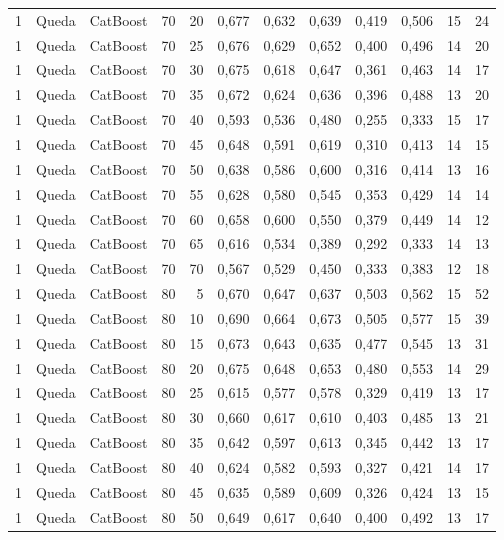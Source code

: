 \begin{longtable}{@{}rllrrrrrrrrr@{}}
1 & Queda & CatBoost & 70 & 20 & 0,677 & 0,632 & 0,639 & 0,419 & 0,506 & 15 & 24 \\
1 & Queda & CatBoost & 70 & 25 & 0,676 & 0,629 & 0,652 & 0,400 & 0,496 & 14 & 20 \\
1 & Queda & CatBoost & 70 & 30 & 0,675 & 0,618 & 0,647 & 0,361 & 0,463 & 14 & 17 \\
1 & Queda & CatBoost & 70 & 35 & 0,672 & 0,624 & 0,636 & 0,396 & 0,488 & 13 & 20 \\
1 & Queda & CatBoost & 70 & 40 & 0,593 & 0,536 & 0,480 & 0,255 & 0,333 & 15 & 17 \\
1 & Queda & CatBoost & 70 & 45 & 0,648 & 0,591 & 0,619 & 0,310 & 0,413 & 14 & 15 \\
1 & Queda & CatBoost & 70 & 50 & 0,638 & 0,586 & 0,600 & 0,316 & 0,414 & 13 & 16 \\
1 & Queda & CatBoost & 70 & 55 & 0,628 & 0,580 & 0,545 & 0,353 & 0,429 & 14 & 14 \\
1 & Queda & CatBoost & 70 & 60 & 0,658 & 0,600 & 0,550 & 0,379 & 0,449 & 14 & 12 \\
1 & Queda & CatBoost & 70 & 65 & 0,616 & 0,534 & 0,389 & 0,292 & 0,333 & 14 & 13 \\
1 & Queda & CatBoost & 70 & 70 & 0,567 & 0,529 & 0,450 & 0,333 & 0,383 & 12 & 18 \\
1 & Queda & CatBoost & 80 & 5 & 0,670 & 0,647 & 0,637 & 0,503 & 0,562 & 15 & 52 \\
1 & Queda & CatBoost & 80 & 10 & 0,690 & 0,664 & 0,673 & 0,505 & 0,577 & 15 & 39 \\
1 & Queda & CatBoost & 80 & 15 & 0,673 & 0,643 & 0,635 & 0,477 & 0,545 & 13 & 31 \\
1 & Queda & CatBoost & 80 & 20 & 0,675 & 0,648 & 0,653 & 0,480 & 0,553 & 14 & 29 \\
1 & Queda & CatBoost & 80 & 25 & 0,615 & 0,577 & 0,578 & 0,329 & 0,419 & 13 & 17 \\
1 & Queda & CatBoost & 80 & 30 & 0,660 & 0,617 & 0,610 & 0,403 & 0,485 & 13 & 21 \\
1 & Queda & CatBoost & 80 & 35 & 0,642 & 0,597 & 0,613 & 0,345 & 0,442 & 13 & 17 \\
1 & Queda & CatBoost & 80 & 40 & 0,624 & 0,582 & 0,593 & 0,327 & 0,421 & 14 & 17 \\
1 & Queda & CatBoost & 80 & 45 & 0,635 & 0,589 & 0,609 & 0,326 & 0,424 & 13 & 15 \\
1 & Queda & CatBoost & 80 & 50 & 0,649 & 0,617 & 0,640 & 0,400 & 0,492 & 13 & 17 \\

\end{longtable}
